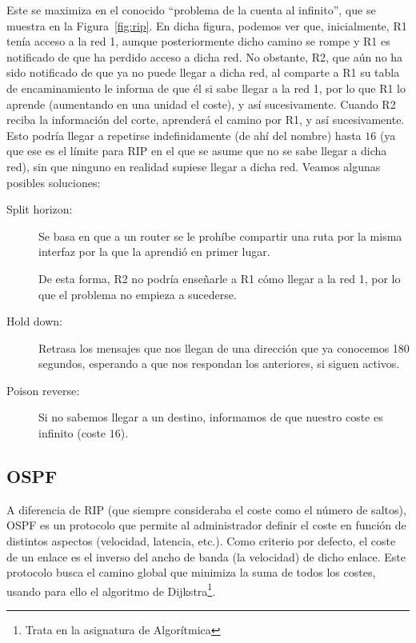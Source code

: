Este se maximiza en el conocido ``problema de la cuenta al infinito'', que se muestra en la Figura~\ref{fig:rip}. En dicha figura, podemos ver que, inicialmente, R1 tenía acceso a la red 1, aunque posteriormente dicho camino se rompe y R1 es notificado de que ha perdido acceso a dicha red. No obstante, R2, que aún no ha sido notificado de que ya no puede llegar a dicha red, al comparte a R1 su tabla de encaminamiento le informa de que él si sabe llegar a la red 1, por lo que R1 lo aprende (aumentando en una unidad el coste), y así sucesivamente. Cuando R2 reciba la información del corte, aprenderá el camino por R1, y así sucesivamente. Esto podría llegar a repetirse indefinidamente (de ahí del nombre) hasta $16$ (ya que ese es el límite para \acrshort{RIP} en el que se asume que no se sabe llegar a dicha red), sin que ninguno en realidad supiese llegar a dicha red. Veamos algunas posibles soluciones:
\begin{description}
    \item [Split horizon:] Se basa en que a un router se le prohíbe compartir una ruta por la misma interfaz por la que la aprendió en primer lugar.
    
    De esta forma, R2 no podría enseñarle a R1 cómo llegar a la red 1, por lo que el problema no empieza a sucederse.
    \item [Hold down:] Retrasa los mensajes que nos llegan de una dirección que ya conocemos 180 segundos, esperando a que nos respondan los anteriores, si siguen activos. 
    \item [Poison reverse:] Si no sabemos llegar a un destino, informamos de que nuestro coste es infinito (coste $16$).
\end{description}

\subsection{\acrfull{OSPF}}

A diferencia de \acrshort{RIP} (que siempre consideraba el coste como el número de saltos), \acrshort{OSPF} es un protocolo que permite al administrador definir el coste en función de distintos aspectos (velocidad, latencia, etc.).
Como criterio por defecto, el coste de un enlace es el inverso del ancho de banda (la velocidad) de dicho enlace. Este protocolo busca el camino global que minimiza la suma de todos los costes, usando para ello el algoritmo de Dijkstra\footnote{Trata en la asignatura de Algorítmica}.\\

